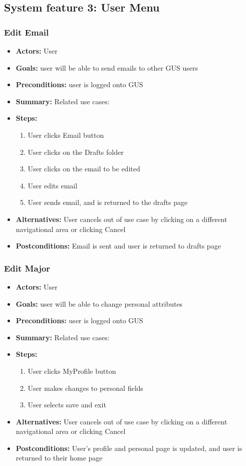 \documentclass[12pt, oneside, letterpaper]{report}
\begin{document}
		\subsection{System feature 3: User Menu}
         \subsubsection{Edit Email}
			\begin{itemize}
				\item{\textbf{Actors:} User}
				\item{\textbf{Goals:} user will be able to send emails to other GUS users}
				\item{\textbf{Preconditions:} user is logged onto GUS}
				\item{\textbf{Summary:} Related use cases: }
				\item{\textbf{Steps:}
				\begin{enumerate}
					\item{User clicks Email button}
					\item{User clicks on the Drafts folder}
					\item{User clicks on the email to be edited}
					\item{User edits email}
					\item{User sends email, and is returned to the drafts page}
				\end{enumerate}
				}
				\item{\textbf{Alternatives:} User cancels out of use case by clicking on a different navigational area or clicking Cancel}
				\item{\textbf{Postconditions:} Email is sent and user is returned to drafts page}
			\end{itemize}
         \subsubsection{Edit Major}
			\begin{itemize}
				\item{\textbf{Actors:} User}
				\item{\textbf{Goals:} user will be able to change personal attributes}
				\item{\textbf{Preconditions:} user is logged onto GUS}
				\item{\textbf{Summary:} Related use cases: }
				\item{\textbf{Steps:}
				\begin{enumerate}
					\item{User clicks MyProfile button}
					\item{User makes changes to personal fields}
					\item{User selects save and exit}
				\end{enumerate}
				}
				\item{\textbf{Alternatives:} User cancels out of use case by clicking on a different navigational area or clicking Cancel}
				\item{\textbf{Postconditions:} User's profile and personal page is updated, and user is returned to their home page}
			\end{itemize}
\end{document}
